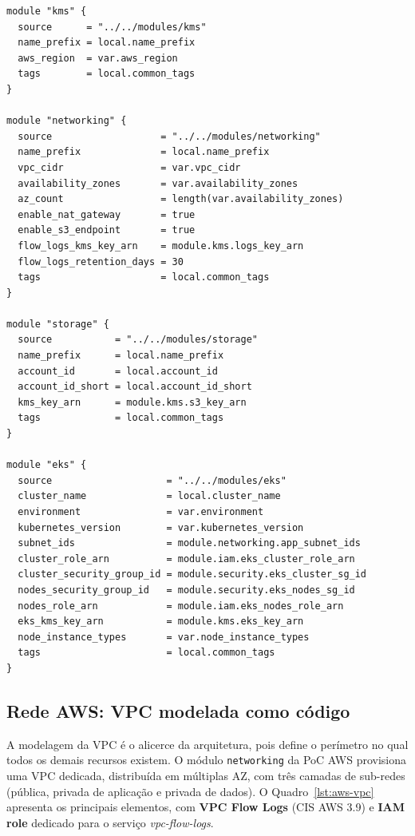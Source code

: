\begin{lstlisting}[language=HCL,caption={Composição do ambiente \texttt{dev} na PoC AWS (\texttt{terraform/environments/dev/main.tf}). Ordem de resolução: KMS $\rightarrow$ Networking $\rightarrow$ IAM $\rightarrow$ Security $\rightarrow$ Storage $\rightarrow$ Secrets $\rightarrow$ Database $\rightarrow$ EKS.},label={lst:aws-envdev}]
module "kms" {
  source      = "../../modules/kms"
  name_prefix = local.name_prefix
  aws_region  = var.aws_region
  tags        = local.common_tags
}

module "networking" {
  source                   = "../../modules/networking"
  name_prefix              = local.name_prefix
  vpc_cidr                 = var.vpc_cidr
  availability_zones       = var.availability_zones
  az_count                 = length(var.availability_zones)
  enable_nat_gateway       = true
  enable_s3_endpoint       = true
  flow_logs_kms_key_arn    = module.kms.logs_key_arn
  flow_logs_retention_days = 30
  tags                     = local.common_tags
}

module "storage" {
  source           = "../../modules/storage"
  name_prefix      = local.name_prefix
  account_id       = local.account_id
  account_id_short = local.account_id_short
  kms_key_arn      = module.kms.s3_key_arn
  tags             = local.common_tags
}

module "eks" {
  source                    = "../../modules/eks"
  cluster_name              = local.cluster_name
  environment               = var.environment
  kubernetes_version        = var.kubernetes_version
  subnet_ids                = module.networking.app_subnet_ids
  cluster_role_arn          = module.iam.eks_cluster_role_arn
  cluster_security_group_id = module.security.eks_cluster_sg_id
  nodes_security_group_id   = module.security.eks_nodes_sg_id
  nodes_role_arn            = module.iam.eks_nodes_role_arn
  eks_kms_key_arn           = module.kms.eks_key_arn
  node_instance_types       = var.node_instance_types
  tags                      = local.common_tags
}
\end{lstlisting}

\subsection{Rede AWS: VPC modelada como código}

A modelagem da VPC é o alicerce da arquitetura, pois define o perímetro no qual todos os demais recursos existem. O módulo \texttt{networking} da PoC AWS provisiona uma VPC dedicada, distribuída em múltiplas AZ, com três camadas de sub-redes (pública, privada de aplicação e privada de dados). O Quadro~\ref{lst:aws-vpc} apresenta os principais elementos, com \textbf{VPC Flow Logs} (CIS AWS 3.9) e \textbf{IAM role} dedicado para o serviço \textit{vpc-flow-logs}.

